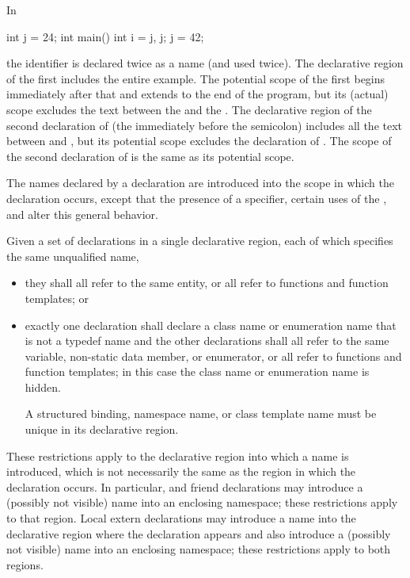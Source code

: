 \pnum
\begin{example}
In

\begin{codeblock}
int j = 24;
int main() {
  int i = j, j;
  j = 42;
}
\end{codeblock}

the identifier  is declared twice as a name (and used twice).
The declarative region of the first  includes the entire
example. The potential scope of the first  begins immediately
after that  and extends to the end of the program, but its
(actual) scope excludes the text between the \tcode{,} and the
\tcode{\}}. The declarative region of the second declaration of
 (the  immediately before the semicolon) includes all
the text between \tcode{\{} and \tcode{\}}, but its potential scope
excludes the declaration of . The scope of the second
declaration of  is the same as its potential scope.
\end{example}

\pnum
The names declared by a declaration are introduced into the scope in
which the declaration occurs, except that the presence of a
 specifier, certain uses of the
, and
 alter this general
behavior.

\pnum
Given a set of declarations in a single declarative region, each of
which specifies the same unqualified name,
\begin{itemize}
\item they shall all refer to the same entity, or all refer to functions
and function templates; or
\item exactly one declaration shall declare a class name or enumeration
name that is not a typedef name and the other declarations shall
all refer to the same variable, non-static data member, or enumerator,
or all refer to functions and function templates;
in this case the class name or enumeration name is
hidden.
\begin{note}
A structured binding,
namespace name, or
class template name
must be unique in its declarative region.
\end{note}
\end{itemize}
\begin{note} These restrictions apply to the declarative region into which
a name is introduced, which is not necessarily the same as the region in
which the declaration occurs. In particular,
 and
friend declarations may introduce a (possibly not
visible) name into an enclosing namespace; these restrictions apply to
that region. Local extern declarations may introduce
a name into the declarative region where the declaration appears and
also introduce a (possibly not visible) name into an enclosing
namespace; these restrictions apply to both regions. \end{note}

